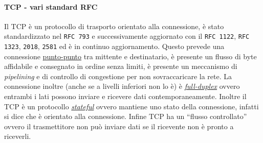     \paragraph{\Acrshort*{TCP} - vari standard \Acrshort*{RFC}} Il \acrfull*{TCP} è un protocollo di trasporto orientato alla connessione, è stato standardizzato nel \texttt{\Acrshort*{RFC} 793} e successivamente aggiornato con il \texttt{\Acrshort*{RFC} 1122}, \texttt{\Acrshort*{RFC} 1323}, \texttt{2018}, \texttt{2581} ed è in continuo aggiornamento. Questo prevede una connessione \underline{punto-punto} tra mittente e destinatario, è presente un flusso di byte affidabile e consegnato in ordine senza limiti, è presente un meccanismo di \textit{pipelining} e di controllo di congestione per non sovraccaricare la rete. La connessione inoltre (anche se a livelli inferiori non lo è) è \textit{\underline{full-duplex}} ovvero entrambi i lati possono inviare e ricevere dati contemporaneamente. Inoltre il \Acrshort*{TCP} è un protocollo \textit{\underline{stateful}} ovvero mantiene uno stato della connessione, infatti si dice che è orientato alla connessione. Infine \Acrshort*{TCP} ha un ``flusso controllato'' ovvero il trasmettitore non può inviare dati se il ricevente non è pronto a riceverli.
